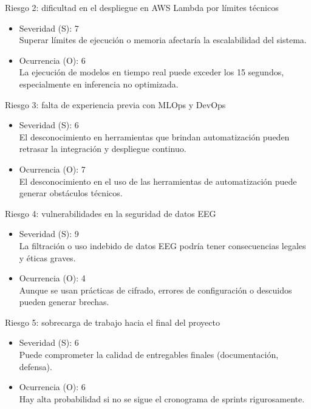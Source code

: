\documentclass[
11pt, %
]{charter}
\begin{document}
Riesgo 2: dificultad en el despliegue en AWS Lambda por límites técnicos
\begin{itemize}
    \item Severidad (S): 7 \\
    Superar límites de ejecución o memoria afectaría la escalabilidad del sistema.
    \item Ocurrencia (O): 6 \\
    La ejecución de modelos en tiempo real puede exceder los 15 segundos, especialmente en inferencia no optimizada.
\end{itemize}

Riesgo 3: falta de experiencia previa con MLOps y DevOps
\begin{itemize}
    \item Severidad (S): 6 \\
    El desconocimiento en herramientas que brindan automatización pueden retrasar la integración y despliegue continuo.
    
    \item Ocurrencia (O): 7 \\
    El desconocimiento en el uso de las herramientas de automatización puede generar obstáculos técnicos.
\end{itemize}

Riesgo 4: vulnerabilidades en la seguridad de datos EEG
\begin{itemize}
    \item Severidad (S): 9 \\
    La filtración o uso indebido de datos EEG podría tener consecuencias legales y éticas graves.
    \item Ocurrencia (O): 4 \\
    Aunque se usan prácticas de cifrado, errores de configuración o descuidos pueden generar brechas.
\end{itemize}

Riesgo 5: sobrecarga de trabajo hacia el final del proyecto
\begin{itemize}
    \item Severidad (S): 6 \\
    Puede comprometer la calidad de entregables finales (documentación, defensa).
    \item Ocurrencia (O): 6 \\
    Hay alta probabilidad si no se sigue el cronograma de sprints rigurosamente.
\end{itemize}
\end{document}
